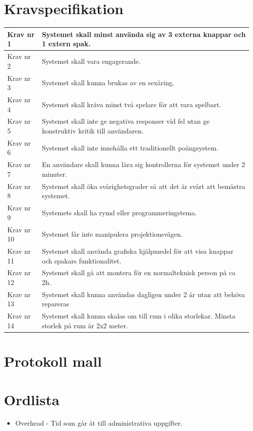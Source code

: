 \documentclass[a4paper,12pt,oneside,final]{extbook}
\begin{document}




\pagestyle{empty}

\appendix

\chapter{Kravspecifikation}\label{Kravspecifikation}
\begin{center}
	\begin{tabular}{ | m{5em} | m{30em}| } 
		\hline
		Krav nr 1& Systemet skall minst använda sig av 3 externa knappar och 1 extern spak.   \\ 
		\hline
		Krav nr 2 & Systemet skall vara engagerande.  \\ 
		\hline
		Krav nr 3 & Systemet skall kunna brukas av en sexåring. \\ 
		\hline
		Krav nr 4& Systemet skall kräva minst två spelare för att vara spelbart. \\ 
		\hline
		Krav nr 5 & Systemet skall inte ge negativa responser vid fel utan ge konstruktiv kritik till användaren. \\ 
		\hline
		Krav nr 6 & Systemet skall inte innehålla ett traditionellt poängsystem. \\ 
		\hline
		Krav nr 7& En användare skall kunna lära sig kontrollerna för systemet under 2 minuter. \\ 
		\hline
		Krav nr 8 & Systemet skall öka svårighetsgrader så att det är svårt att bemästra systemet. \\ 
		\hline
		Krav nr 9 & Systemets skall ha rymd eller programmeringstema. \\ 
		\hline
		Krav nr 10& Systemet får inte manipulera projektionsvägen. \\ 
		\hline
		Krav nr 11& Systemet skall använda grafiska hjälpmedel för att visa knappar och spakars funktionalitet.  \\ 
		\hline
		Krav nr 12& Systemet skall gå att montera för en normalteknisk person på ca 2h. \\ 
		\hline
		Krav nr 13& Systemet skall kunna användas dagligen under 2 år utan att behöva repareras \\ 
		\hline
		Krav nr 14 & Systemet skall kunna skalas om till rum i olika storlekar. Minsta storlek på rum är 2x2 meter. \\ 
		\hline
	\end{tabular}
\end{center}


\chapter{Protokoll mall}\label{protokoll}

\chapter{Ordlista}\label{Ordlista}
\begin{itemize}
	\item Overhead - Tid som går åt till administrativa uppgifter. 
\end{itemize}
\end{document}
